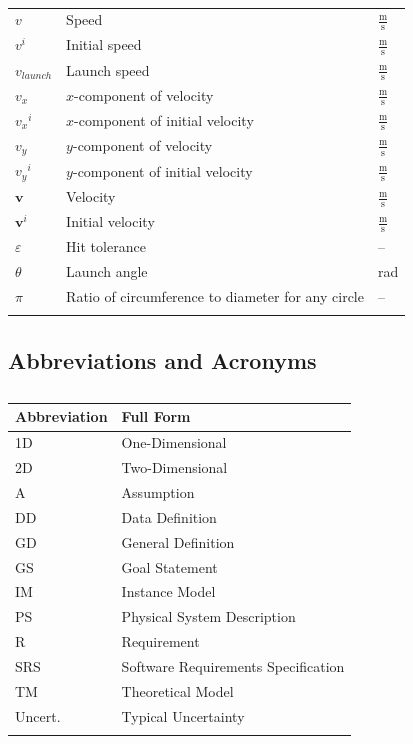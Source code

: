 \documentclass[12pt]{article}
\begin{document}
\begin{longtabu}{l X[l] l}
$v$ & Speed & $\frac{\text{m}}{\text{s}}$
\\
${v^{i}}$ & Initial speed & $\frac{\text{m}}{\text{s}}$
\\
${v_{launch}}$ & Launch speed & $\frac{\text{m}}{\text{s}}$
\\
${v_{x}}$ & $x$-component of velocity & $\frac{\text{m}}{\text{s}}$
\\
${{v_{x}}^{i}}$ & $x$-component of initial velocity & $\frac{\text{m}}{\text{s}}$
\\
${v_{y}}$ & $y$-component of velocity & $\frac{\text{m}}{\text{s}}$
\\
${{v_{y}}^{i}}$ & $y$-component of initial velocity & $\frac{\text{m}}{\text{s}}$
\\
$\mathbf{v}$ & Velocity & $\frac{\text{m}}{\text{s}}$
\\
${\mathbf{v}^{i}}$ & Initial velocity & $\frac{\text{m}}{\text{s}}$
\\
$ε$ & Hit tolerance & --
\\
$θ$ & Launch angle & rad
\\
$π$ & Ratio of circumference to diameter for any circle & --
\\
\bottomrule
\caption{}
\label{Table:ToS}
\end{longtabu}
\subsection{Abbreviations and Acronyms}
\label{Sec:TAbbAcc}
\begin{longtable}{l l}
\toprule
\textbf{Abbreviation} & \textbf{Full Form}
\\
\midrule
\endhead
1D & One-Dimensional
\\
2D & Two-Dimensional
\\
A & Assumption
\\
DD & Data Definition
\\
GD & General Definition
\\
GS & Goal Statement
\\
IM & Instance Model
\\
PS & Physical System Description
\\
R & Requirement
\\
SRS & Software Requirements Specification
\\
TM & Theoretical Model
\\
Uncert. & Typical Uncertainty
\\
\bottomrule
\caption{}
\label{Table:TAbbAcc}
\end{longtable}
\end{document}
